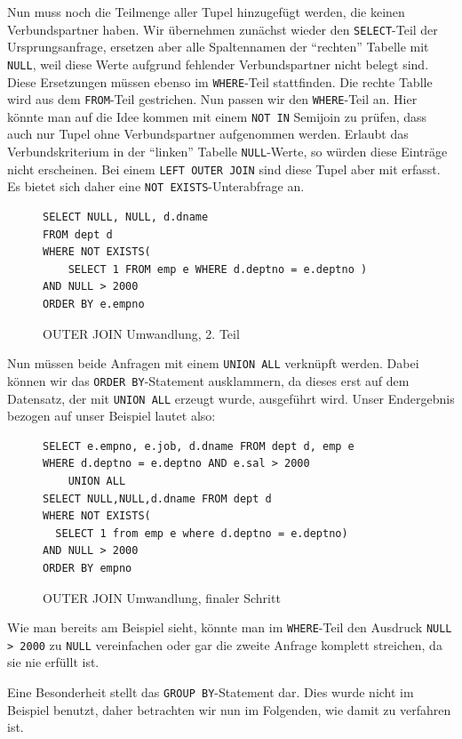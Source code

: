 Nun muss noch die Teilmenge aller Tupel hinzugefügt werden, die keinen Verbundspartner haben. Wir übernehmen zunächst wieder den \verb|SELECT|-Teil der Ursprungsanfrage, ersetzen aber alle Spaltennamen der ``rechten'' Tabelle mit \verb|NULL|, weil diese Werte aufgrund fehlender Verbundspartner nicht belegt sind. Diese Ersetzungen müssen ebenso im \verb|WHERE|-Teil stattfinden. Die rechte Tablle wird aus dem \verb|FROM|-Teil gestrichen. Nun passen wir den \verb|WHERE|-Teil an. Hier könnte man auf die Idee kommen mit einem \verb|NOT IN| Semijoin zu prüfen, dass auch nur Tupel ohne Verbundspartner aufgenommen werden. Erlaubt  das Verbundskriterium in der ``linken'' Tabelle \verb|NULL|-Werte, so würden diese Einträge nicht erscheinen. Bei einem \verb|LEFT OUTER JOIN| sind diese Tupel aber mit erfasst. Es bietet sich daher eine \verb|NOT EXISTS|-Unterabfrage an. 

\begin{figure}[h]
\begin{verbatim}
SELECT NULL, NULL, d.dname
FROM dept d 
WHERE NOT EXISTS(
    SELECT 1 FROM emp e WHERE d.deptno = e.deptno )
AND NULL > 2000
ORDER BY e.empno
\end{verbatim}
\caption{OUTER JOIN Umwandlung, 2. Teil}
\end{figure}

Nun müssen beide Anfragen mit einem \verb|UNION ALL| verknüpft werden. Dabei können wir das \verb|ORDER BY|-Statement ausklammern, da dieses erst auf dem Datensatz, der mit \verb|UNION ALL| erzeugt wurde, ausgeführt wird. Unser Endergebnis bezogen auf unser Beispiel lautet also:

\begin{figure}[h]
\begin{verbatim}
SELECT e.empno, e.job, d.dname FROM dept d, emp e
WHERE d.deptno = e.deptno AND e.sal > 2000
    UNION ALL
SELECT NULL,NULL,d.dname FROM dept d 
WHERE NOT EXISTS(
  SELECT 1 from emp e where d.deptno = e.deptno)
AND NULL > 2000
ORDER BY empno
\end{verbatim}
\caption{OUTER JOIN Umwandlung, finaler Schritt}
\end{figure}

Wie man bereits am Beispiel sieht, könnte man im \verb|WHERE|-Teil den Ausdruck \verb|NULL > 2000| zu \verb|NULL| vereinfachen oder gar die zweite Anfrage komplett streichen, da sie nie erfüllt ist. 

Eine Besonderheit stellt das \verb|GROUP BY|-Statement dar. Dies wurde nicht im Beispiel benutzt, daher betrachten wir nun im Folgenden, wie damit zu verfahren ist.

